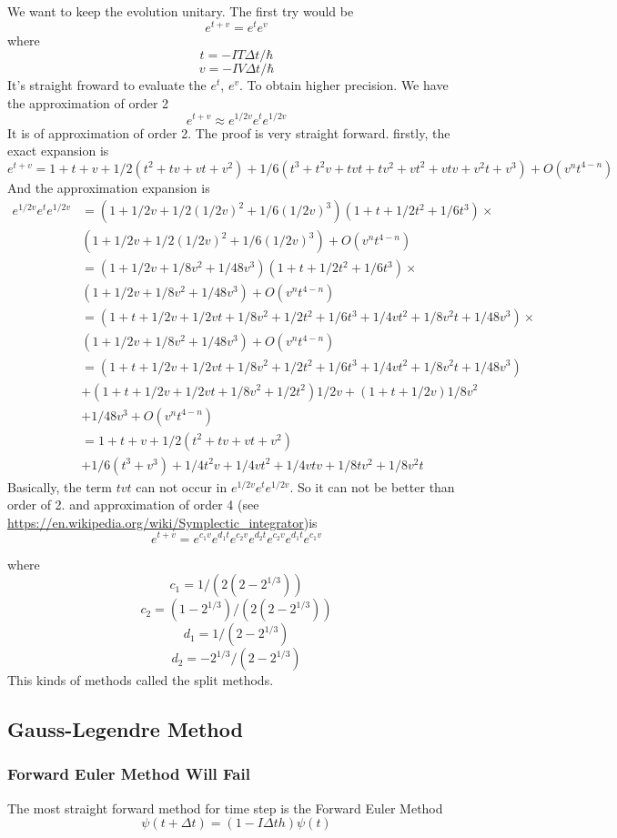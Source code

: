 \documentclass[12pt,twoside]{article}
\begin{document}
We want to keep the evolution unitary. The first try would be
$$
e^{t+v}=e^t e^v
$$
where
$$
t=-I T\Delta t/\hbar
$$
$$
v=-I V\Delta t/\hbar
$$
It's straight froward to evaluate the $e^t$, $e^v$. To obtain higher precision. We have the approximation of order 2
$$
e^{t+v} \approx e^{1/2 v} e^{ t} e^{1/2 v}
$$
It is of approximation of order 2. The proof is very straight forward.
firstly, the exact expansion is
$$
e^{t+v} = 1 + t + v + 1/2 (t^2 + tv + vt + v^2) + 1/6 (t^3 + t^2v + tvt + tv^2 + vt^2 + vtv + v^2t + v^3) + O(v^nt^{4-n})
$$
And the approximation expansion is
\begin{align*}
e^{1/2 v} e^{ t} e^{1/2 v} &=(1 + 1/2v + 1/2(1/2v)^2+1/6 (1/2v)^3) (1 + t + 1/2t^2+1/6 t^3)\times\\
&(1 + 1/2v + 1/2(1/2v)^2+1/6 (1/2v)^3)+ O(v^nt^{4-n})\\
&=(1 + 1/2v + 1/8v^2+1/48 v^3) (1 + t + 1/2t^2+1/6 t^3)\times\\
&(1 + 1/2v + 1/8v^2+1/48 v^3)+ O(v^nt^{4-n})\\
&=(1 + t + 1/2v + 1/2 vt + 1/8 v^2 + 1/2t^2 + 1/6 t^3  + 1/4 vt^2+ 1/8 v^2t + 1/48 v^3)\times\\
&(1 + 1/2v + 1/8v^2+1/48 v^3)+ O(v^nt^{4-n})\\
&=(1 + t + 1/2v + 1/2 vt + 1/8 v^2 + 1/2t^2 + 1/6 t^3  + 1/4 vt^2+ 1/8 v^2t + 1/48 v^3)\\
&+ (1 + t + 1/2v + 1/2 vt + 1/8 v^2 + 1/2t^2)1/2v
+ (1 + t + 1/2v)1/8v^2\\
&+ 1/48v^3 + O(v^nt^{4-n})\\
&= 1 + t + v + 1/2 (t^2 + tv + vt + v^2)\\
&+ 1/6(t^3 + v^3) + 1/4 t^2 v + 1/4 v t^2 + 1/4 vtv + 1/8 tv^2 + 1/8 v^2 t
\end{align*}
Basically, the term $tvt$ can not occur in $e^{1/2 v} e^{ t} e^{1/2 v}$. So it can not be better than order of 2.
and approximation of order 4 (see \url{https://en.wikipedia.org/wiki/Symplectic_integrator})is
$$
e^{t+v} = e^{c_1 v} e^{d_1 t} e^{c_2 v} e^{d_2 t} e^{ c_2 v} e^{ d_1 t} e^{ c_1 v}
$$

where
$$
c_1 = 1/(2(2-2^{1/3}))
$$
$$
c_2 = (1-2^{1/3})/(2(2-2^{1/3}))
$$
$$
d_1 = 1/(2-2^{1/3})
$$
$$
d_2 = -2^{1/3}/(2-2^{1/3})
$$
This kinds of methods called the split methods.
\subsection{Gauss-Legendre Method}

\subsubsection{Forward Euler Method Will Fail}
The most straight forward method for time step is the Forward Euler Method
$$
\psi(t + \Delta t) = (1 - I \Delta t h) \psi(t)
$$
\end{document}
